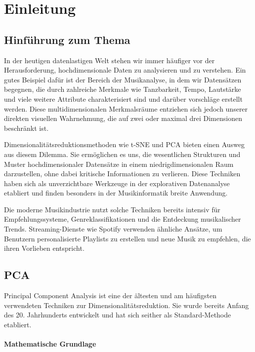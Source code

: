 
\chapter{Einleitung}

\section{Hinführung zum Thema}
In der heutigen datenlastigen Welt stehen wir immer häufiger vor der Herausforderung, hochdimensionale Daten zu analysieren und zu verstehen. Ein gutes Beispiel dafür ist der Bereich der Musikanalyse, in dem wir Datensätzen begegnen, die durch zahlreiche Merkmale wie Tanzbarkeit, Tempo, Lautstärke und viele weitere Attribute charakterisiert sind und darüber vorschläge erstellt werden. Diese multidimensionalen Merkmalsräume entziehen sich jedoch unserer direkten visuellen Wahrnehmung, die auf zwei oder maximal drei Dimensionen beschränkt ist.

Dimensionalitätsreduktionsmethoden wie \ac{t-SNE} und \ac{PCA} bieten einen Ausweg aus diesem Dilemma. Sie ermöglichen es uns, die wesentlichen Strukturen und Muster hochdimensionaler Datensätze in einem niedrigdimensionalen Raum darzustellen, ohne dabei kritische Informationen zu verlieren. Diese Techniken haben sich als unverzichtbare Werkzeuge in der explorativen Datenanalyse etabliert und finden besonders in der Musikinformatik breite Anwendung.

Die moderne Musikindustrie nutzt solche Techniken bereits intensiv für Empfehlungssysteme, Genreklassifikationen und die Entdeckung musikalischer Trends. Streaming-Dienste wie Spotify verwenden ähnliche Ansätze, um Benutzern personalisierte Playlists zu erstellen und neue Musik zu empfehlen, die ihren Vorlieben entspricht.

\section{\acf{PCA}}

Principal Component Analysis ist eine der ältesten und am häufigsten verwendeten Techniken zur Dimensionalitätsreduktion. Sie wurde bereits Anfang des 20. Jahrhunderts entwickelt und hat sich seither als Standard-Methode etabliert.

\subsubsection{Mathematische Grundlage}

